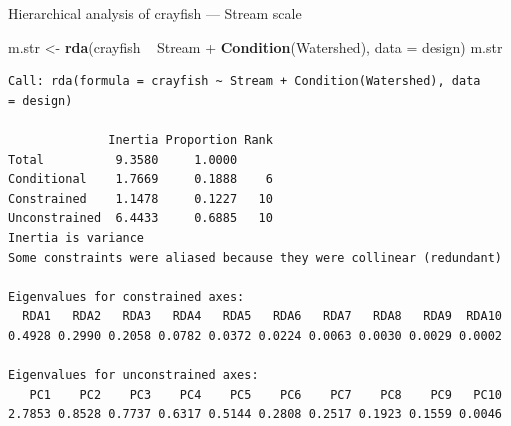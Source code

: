 \documentclass[10pt,ignorenonframetext,compress, aspectratio=169]{beamer}
\newenvironment{Shaded}{\begin{snugshade}}{\end{snugshade}}
\newcommand{\KeywordTok}[1]{\textcolor[rgb]{0.13,0.29,0.53}{\textbf{{#1}}}}
\newcommand{\DataTypeTok}[1]{\textcolor[rgb]{0.13,0.29,0.53}{{#1}}}
\newcommand{\StringTok}[1]{\textcolor[rgb]{0.31,0.60,0.02}{{#1}}}
\newcommand{\NormalTok}[1]{{#1}}
\begin{document}
\begin{frame}[fragile]{Hierarchical analysis of crayfish --- Stream
scale}

\scriptsize

\begin{Shaded}
\begin{Highlighting}[]
\NormalTok{m.str <-}\StringTok{ }\KeywordTok{rda}\NormalTok{(crayfish ~}\StringTok{ }\NormalTok{Stream +}\StringTok{ }\KeywordTok{Condition}\NormalTok{(Watershed), }\DataTypeTok{data =} \NormalTok{design)}
\NormalTok{m.str}
\end{Highlighting}
\end{Shaded}

\begin{verbatim}
Call: rda(formula = crayfish ~ Stream + Condition(Watershed), data
= design)

              Inertia Proportion Rank
Total          9.3580     1.0000     
Conditional    1.7669     0.1888    6
Constrained    1.1478     0.1227   10
Unconstrained  6.4433     0.6885   10
Inertia is variance 
Some constraints were aliased because they were collinear (redundant)

Eigenvalues for constrained axes:
  RDA1   RDA2   RDA3   RDA4   RDA5   RDA6   RDA7   RDA8   RDA9  RDA10 
0.4928 0.2990 0.2058 0.0782 0.0372 0.0224 0.0063 0.0030 0.0029 0.0002 

Eigenvalues for unconstrained axes:
   PC1    PC2    PC3    PC4    PC5    PC6    PC7    PC8    PC9   PC10 
2.7853 0.8528 0.7737 0.6317 0.5144 0.2808 0.2517 0.1923 0.1559 0.0046 
\end{verbatim}

\normalsize

\end{frame}
\end{document}
